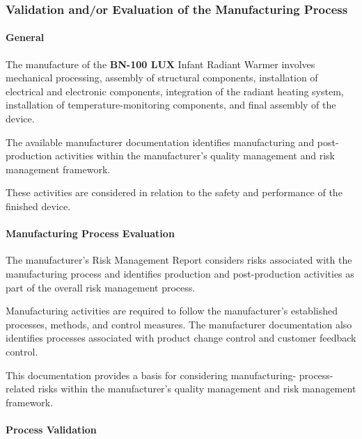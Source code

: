 ﻿

\hypertarget{p3-2-2-5}{}

\subsubsection{Validation and/or Evaluation of the Manufacturing Process}

\paragraph{General}

The manufacture of the \textbf{BN-100 LUX} Infant Radiant Warmer
involves mechanical processing, assembly of structural components,
installation of electrical and electronic components, integration of
the radiant heating system, installation of temperature-monitoring
components, and final assembly of the device.

The available manufacturer documentation identifies manufacturing
and post-production activities within the manufacturer's quality
management and risk management framework.

These activities are considered in relation to the safety and
performance of the finished device.

\paragraph{Manufacturing Process Evaluation}

The manufacturer's Risk Management Report considers risks associated
with the manufacturing process and identifies production and
post-production activities as part of the overall risk management
process.

Manufacturing activities are required to follow the manufacturer's
established processes, methods, and control measures. The manufacturer
documentation also identifies processes associated with product
change control and customer feedback control.

This documentation provides a basis for considering manufacturing-
process-related risks within the manufacturer's quality management
and risk management framework.

\paragraph{Process Validation}

